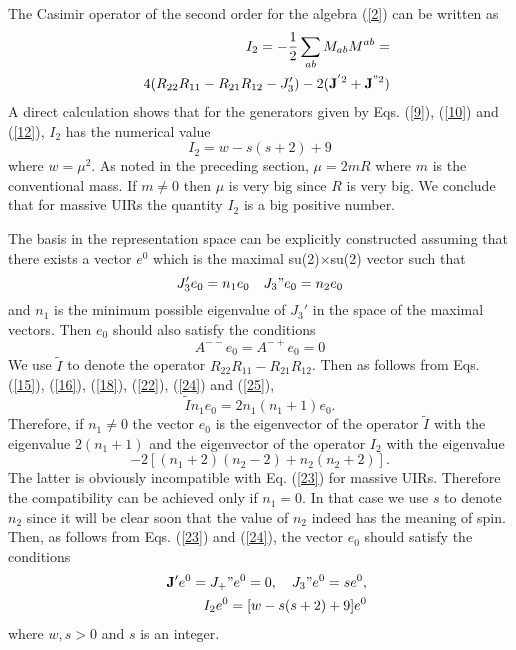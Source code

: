 \documentclass[a4paper,12pt]{article}%
\begin{document}
The Casimir operator of the second order for the 
algebra  (\ref{2}) can be written as
\begin{eqnarray}
&&I_2 =-\frac{1}{2}\sum_{ab} M_{ab}M^{ab}=\nonumber\\
&&4(R_{22}R_{11}-R_{21}R_{12}-J_3')-
2({\bf J}^{'2}+{\bf J}^{"2})
\label{22}
\end{eqnarray}
A direct calculation shows that for the
generators given by Eqs. (\ref{9}), (\ref{10}) and 
(\ref{12}), $I_2$  has the numerical  value
\begin{equation}
I_2 =w-s(s+2)+9
\label{23}
\end{equation}
where $w=\mu^2$. As noted in the preceding section,
$\mu = 2mR$ where $m$ is the conventional mass. If $m \neq 0$
then $\mu$ is very big since $R$ is very big. We conclude
that for massive UIRs the quantity $I_2$ is a big positive
number.

 The basis in the representation space
can be explicitly constructed assuming that there exists a
vector $e^0$ which is the maximal su(2)$\times$su(2)
vector such that
\begin{equation}
J_3'e_0=n_1e_0\quad J_3"e_0=n_2e_0
\label{24}
\end{equation}
and $n_1$ is the minimum possible eigenvalue of $J_3'$ in
the space of the maximal vectors. Then $e_0$ should also
satisfy the conditions
\begin{equation}
A^{--}e_0=A^{-+}e_0=0
\label{25}
\end{equation}
We use ${\tilde I}$ to denote the operator 
$R_{22}R_{11}-R_{21}R_{12}$.
Then as follows from Eqs. (\ref{15}), (\ref{16}), (\ref{18}),
(\ref{22}), (\ref{24}) and (\ref{25}),
$${\tilde I}n_1e_0=2n_1(n_1+1)e_0.$$
Therefore, if $n_1\neq 0$ the vector $e_0$ is the eigenvector
of the operator ${\tilde I}$ with the eigenvalue 
$2(n_1+1)$ and the
eigenvector of the operator $I_2$ with the eigenvalue
$$-2[(n_1+2)(n_2-2)+n_2(n_2+2)].$$ 
The latter is obviously incompatible with Eq. (\ref{23})
for massive UIRs. Therefore the compatibility can be
achieved only if $n_1=0$. In that case we use $s$ to denote
$n_2$ since it will be clear soon that the value of $n_2$
indeed has the meaning of spin. Then, as follows from 
Eqs. (\ref{23}) and (\ref{24}), the vector $e_0$ should 
satisfy the conditions  
\begin{eqnarray}
&&{\bf J}'e^0=J_+"e^0=0,\quad J_3"e^0 =se^0, \nonumber\\
&&I_2e^0 =[w-s(s+2)+9] e^0
\label{26}
\end{eqnarray}
where $w,s>0$ and $s$ is an integer.  
\end{document}
